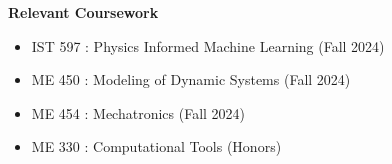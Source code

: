 \begin{center}
    \textbf{Relevant Coursework}
\end{center}

\begin{itemize}[noitemsep, topsep=0pt, partopsep=0pt, parsep=0pt]
    \item IST 597 : Physics Informed Machine Learning (Fall 2024)
    \item ME 450 : Modeling of Dynamic Systems (Fall 2024)
    \item ME 454 : Mechatronics (Fall 2024)
    \item ME 330 : Computational Tools (Honors)
\end{itemize}
